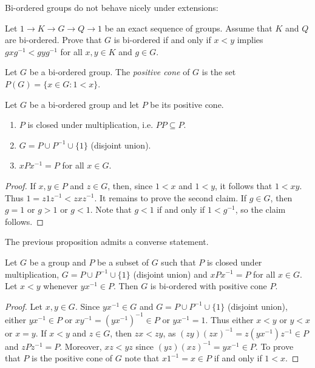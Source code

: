 \begin{graybox}
Bi-ordered groups do not behave nicely under extensions:

\begin{xca}
\label{xca:BO_sequence}
    Let $1\to K\to G\to Q\to 1$ be an exact sequence of groups. Assume that $K$ and $Q$ 
    are bi-ordered. Prove that $G$ is bi-ordered if and only if 
    $x<y$ implies $gxg^{-1}<gyg^{-1}$ for all $x,y\in K$ and $g\in G$. 
\end{xca}

\begin{definition}
	Let $G$ be a bi-ordered group. The \emph{positive cone} of $G$  
	is the set $P(G)=\{x\in
	G:1<x\}$.
\end{definition}

\begin{proposition}
	\label{pro:biordenableP1}
	Let $G$ be a bi-ordered group and let $P$ be its positive cone. 
	\begin{enumerate}
		\item $P$ is closed under multiplication, i.e. $PP\subseteq P$. 
		\item $G=P\cup P^{-1}\cup \{1\}$ (disjoint union).
		\item $xPx^{-1}=P$ for all $x\in G$.
	\end{enumerate}
\end{proposition}

\begin{proof}
	If $x,y\in P$ and $z\in G$, then, since $1<x$ and $1<y$, it follows that 
	$1<xy$.  Thus $1=z1z^{-1}<zxz^{-1}$. It remains to prove the second claim.  
	If $g\in G$, then $g=1$ or $g>1$ or $g<1$. Note that $g<1$ if and only if 
	$1<g^{-1}$, so the claim follows. 
\end{proof}

The previous proposition admits a converse statement. 

\begin{proposition}
	\label{pro:biordenableP2}
	Let $G$ be a group and $P$ be a subset of $G$ such that 
	$P$ is closed under multiplication, $G=P\cup P^{-1}\cup \{1\}$ (disjoint union) and
	$xPx^{-1}=P$ for all $x\in G$. Let $x<y$ whenever  
	$yx^{-1}\in P$. Then $G$ is bi-ordered with positive
	cone $P$.
\end{proposition}

\begin{proof}
	Let $x,y\in G$. Since $yx^{-1}\in G$ and $G=P\cup
	P^{-1}\cup\{1\}$ (disjoint union), 
	either $yx^{-1}\in P$ or $xy^{-1}=(yx^{-1})^{-1}\in
	P$ or $yx^{-1}=1$. Thus either $x<y$ or $y<x$ or $x=y$. If $x<y$ and $z\in
	G$, then $zx<zy$, as $(zy)(zx)^{-1}=z(yx^{-1})z^{-1}\in P$ and  
	$zPz^{-1}=P$. Moreover, $xz<yz$ since $(yz)(xz)^{-1}=yx^{-1}\in P$. To prove
	that $P$ is the positive cone of $G$ note that 
	$x1^{-1}=x\in P$ if and only if $1<x$. 
\end{proof}


\end{graybox}
